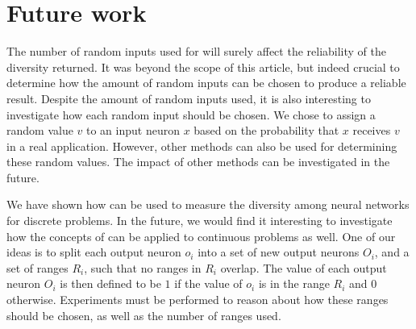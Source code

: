 \section{Future work}\label{sec:futurework}
The number of random inputs used for \dia{} will surely affect the reliability of the diversity returned.
It was beyond the scope of this article, but indeed crucial to determine how the amount of random inputs can be chosen to produce a reliable result.
Despite the amount of random inputs used, it is also interesting to investigate how each random input should be chosen.
We chose to assign a random value $v$ to an input neuron $x$ based on the probability that $x$ receives $v$ in a real application.
However, other methods can also be used for determining these random values.
The impact of other methods can be investigated in the future. 

We have shown how \dia{} can be used to measure the diversity among neural networks for discrete problems.
In the future, we would find it interesting to investigate how the concepts of \dia{} can be applied to continuous problems as well.
One of our ideas is to split each output neuron $o_i$ into a set of new output neurons $O_i$, and a set of ranges $R_i$, such that no ranges in $R_i$ overlap. 
The value of each output neuron $O_i$ is then defined to be $1$ if the value of $o_i$ is in the range $R_i$ and 0 otherwise.
Experiments must be performed to reason about how these ranges should be chosen, as well as the number of ranges used.
